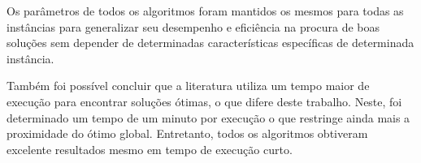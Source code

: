 \documentclass[portugues, brazil, a4paper,12pt]{article}
\begin{document}
	Os parâmetros de todos os algoritmos foram mantidos os mesmos para todas as instâncias para generalizar seu desempenho e eficiência na procura de boas soluções sem depender de determinadas características específicas de determinada instância.

	Também foi possível concluir que a literatura utiliza um tempo maior de execução para encontrar soluções ótimas, o que difere deste trabalho. Neste, foi determinado um tempo de um minuto por execução o que restringe ainda mais a proximidade do ótimo global. Entretanto, todos os algoritmos obtiveram excelente resultados mesmo em tempo de execução curto.
	
	
	
	
	
	
\end{document}
